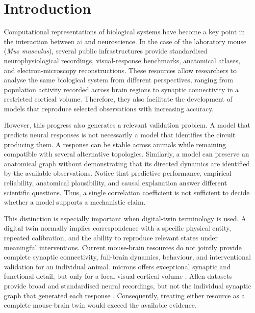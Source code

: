 \documentclass[a4paper,fleqn]{cas-sc}
\begin{document}
\maketitle
\acresetall


\section{Introduction}
\label{sec:introduction}

Computational representations of biological systems have become a key point in
the interaction between \ac{ai} and neuroscience. In the case of the laboratory
mouse (\textit{Mus musculus}), several public infrastructures provide standardised
neurophysiological recordings, visual-response benchmarks, anatomical atlases,
and electron-microscopy reconstructions. These resources allow researchers to
analyse the same biological system from different perspectives, ranging from
population activity recorded across brain regions to synaptic connectivity in a
restricted cortical volume. Therefore, they also facilitate the development of
models that reproduce selected observations with increasing accuracy.

However, this progress also generates a relevant validation problem. A model
that predicts neural responses is not necessarily a model that identifies the
circuit producing them. A response can be stable across animals while remaining
compatible with several alternative topologies. Similarly, a model can preserve
an anatomical graph without demonstrating that its directed dynamics are
identified by the available observations. Notice that predictive performance,
empirical reliability, anatomical plausibility, and causal explanation answer
different scientific questions. Thus, a single correlation coefficient is not
sufficient to decide whether a model supports a mechanistic claim.

This distinction is especially important when digital-twin terminology is used.
A digital twin normally implies correspondence with a specific physical entity,
repeated calibration, and the ability to reproduce relevant states under
meaningful interventions. Current mouse-brain resources do not jointly provide
complete synaptic connectivity, full-brain dynamics, behaviour, and
interventional validation for an individual animal. \ac{microns} offers
exceptional synaptic and functional detail, but only for a local visual-cortical
volume \citep{bae2025microns}. Allen datasets provide broad and standardised
neural recordings, but not the individual synaptic graph that generated each
response \citep{siegle2021survey}. Consequently,
treating either resource as a complete mouse-brain twin would exceed the
available evidence.
\end{document}
